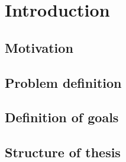 \chapter{Introduction}
\label{cha:Introduction}

\section{Motivation}

\section{Problem definition}

\section{Definition of goals}

\section{Structure of thesis}



